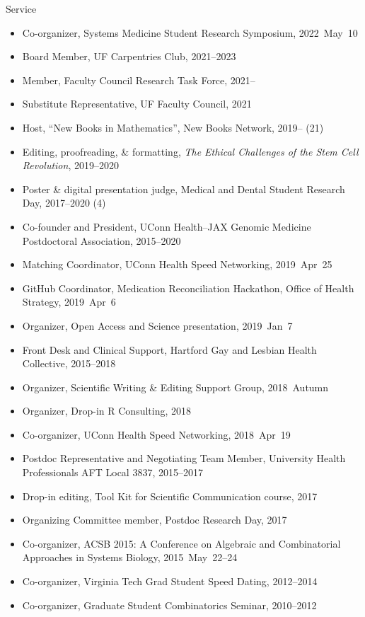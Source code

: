 \documentclass[10pt,a4paper]{article}
\begin{document}
\vspace{.25cm}
{\sc Service}
\begin{itemize}[label=$\circ$,nolistsep]
\item
Co-organizer, Systems Medicine Student Research Symposium, 2022~May~10
\item
Board Member, UF Carpentries Club, 2021--2023
\item
Member, Faculty Council Research Task Force, 2021--
\item
Substitute Representative, UF Faculty Council, 2021
\item
Host, ``New Books in Mathematics'', New Books Network, 2019-- (21)
\item
Editing, proofreading, \& formatting, {\itshape The Ethical Challenges of the Stem Cell Revolution}, 2019--2020
\item
Poster \& digital presentation judge, Medical and Dental Student Research Day, 2017--2020 (4)
\item
Co-founder and President, UConn Health--JAX Genomic Medicine Postdoctoral Association, 2015--2020
\item
Matching Coordinator, UConn Health Speed Networking, 2019~Apr~25
\item
GitHub Coordinator, Medication Reconciliation Hackathon, Office of Health Strategy, 2019~Apr~6
\item
Organizer, Open Access and Science presentation, 2019~Jan~7
\item
Front Desk and Clinical Support, Hartford Gay and Lesbian Health Collective, 2015--2018
\item
Organizer, Scientific Writing \& Editing Support Group, 2018~Autumn
\item
Organizer, Drop-in R Consulting, 2018
\item
Co-organizer, UConn Health Speed Networking, 2018~Apr~19
\item
Postdoc Representative and Negotiating Team Member, University Health Professionals AFT Local 3837, 2015--2017
\item
Drop-in editing, Tool Kit for Scientific Communication course, 2017
\item
Organizing Committee member, Postdoc Research Day, 2017
\item
Co-organizer, ACSB 2015: A Conference on Algebraic and Combinatorial Approaches in Systems Biology, 2015~May~22--24
\item
Co-organizer, Virginia Tech Grad Student Speed Dating, 2012--2014
\item
Co-organizer, Graduate Student Combinatorics Seminar, 2010--2012

\end{itemize}
\end{document}
